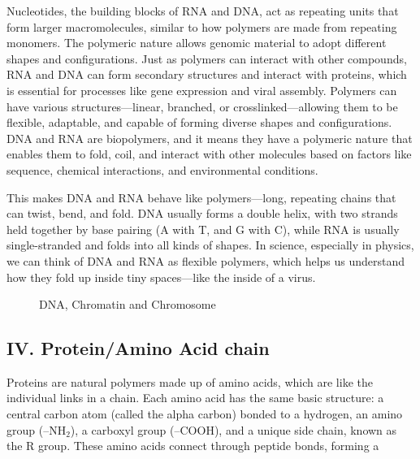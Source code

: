 \documentclass[12pt]{article}
\begin{document}
\begin{flushleft}
Nucleotides, the building blocks of RNA and DNA, act as repeating units  that form larger macromolecules, similar to how polymers are made from repeating monomers. The polymeric nature allows genomic material to adopt different shapes and configurations. Just as polymers can interact with other compounds, RNA and DNA can form secondary structures and interact with proteins, which is essential for processes like gene expression and viral assembly. Polymers can have various structures—linear, branched, or crosslinked—allowing them to be flexible, adaptable, and capable of forming diverse shapes and configurations.  DNA and RNA are biopolymers, and it means they have a polymeric nature that enables them to fold, coil, and interact with other molecules based on factors like sequence, chemical interactions, and environmental conditions.



This makes DNA and RNA behave like polymers—long, repeating chains that can twist, bend, and fold. DNA usually forms a double helix, with two strands held together by base pairing (A with T, and G with C), while RNA is usually single-stranded and folds into all kinds of shapes. In science, especially in physics, we can think of DNA and RNA as flexible polymers, which helps us understand how they fold up inside tiny spaces—like the inside of a virus.

\begin{figure}[!ht]
  \centering
  
  \caption{DNA, Chromatin and Chromosome\cite{byjus_chromatin}}
\end{figure}




\subsection*{IV. Protein/Amino Acid chain}
Proteins are natural polymers made up of amino acids, which are like the individual links in a chain. Each amino acid has the same basic structure: a central carbon atom (called the alpha carbon) bonded to a hydrogen, an amino group (–NH$_2$), a carboxyl group (–COOH), and a unique side chain, known as the R group. These amino acids connect through peptide bonds, forming a 

\begin{figure}[!ht]
  \centering
  

\end{figure}
\end{flushleft}
\end{document}
